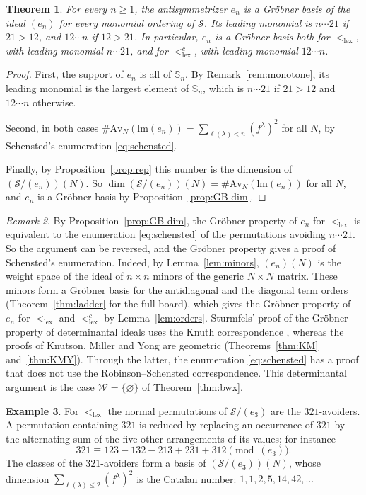 \documentclass[11pt]{amsart}
\newtheorem{theorem}{Theorem}[section]
\theoremstyle{definition}
\newtheorem{example}[theorem]{Example}
\theoremstyle{remark}
\newtheorem{remark}[theorem]{Remark}
\newcommand{\bS}{\mathbb{S}}
\newcommand{\lm}{\mathrm{lm}}
\newcommand{\cS}{\mathscr{S}}
\newcommand{\cW}{\mathcal{W}}
\newcommand{\Av}{\mathrm{Av}}
\newcommand{\lex}{\mathrm{lex}}
\begin{document}
\begin{theorem}\label{thm:en}
For every $n\ge1$, the antisymmetrizer $e_n$ is a Gr\"obner basis of the ideal $(e_n)$ for every monomial ordering of $\cS$. Its leading monomial is $n\cdots21$ if $21>12$, and $12\cdots n$ if $12>21$. In particular, $e_n$ is a Gr\"obner basis both for $<_\lex$, with leading monomial $n\cdots21$, and for $<_\lex^c$, with leading monomial $12\cdots n$.
\end{theorem}

\begin{proof}
First, the support of $e_n$ is all of $\bS_n$. By Remark~\ref{rem:monotone}, its leading monomial is the largest element of $\bS_n$, which is $n\cdots21$ if $21>12$ and $12\cdots n$ otherwise.

Second, in both cases $\#\Av_N(\lm(e_n))=\sum_{\ell(\lambda)<n}(f^\lambda)^2$ for all $N$, by Schensted's enumeration \eqref{eq:schensted}.

Finally, by Proposition~\ref{prop:rep} this number is the dimension of $(\cS/(e_n))(N)$. So $\dim(\cS/(e_n))(N)=\#\Av_N(\lm(e_n))$ for all $N$, and $e_n$ is a Gr\"obner basis by Proposition~\ref{prop:GB-dim}.
\end{proof}

\begin{remark}\label{rem:rsk}
By Proposition~\ref{prop:GB-dim}, the Gr\"obner property of $e_n$ for $<_\lex$ is equivalent to the enumeration \eqref{eq:schensted} of the permutations avoiding $n\cdots21$. So the argument can be reversed, and the Gr\"obner property gives a proof of Schensted's enumeration. Indeed, by Lemma~\ref{lem:minors}, $(e_n)(N)$ is the weight space of the ideal of $n\times n$ minors of the generic $N\times N$ matrix. These minors form a Gr\"obner basis for the antidiagonal and the diagonal term orders (Theorem~\ref{thm:ladder} for the full board), which gives the Gr\"obner property of $e_n$ for $<_\lex$ and $<_\lex^c$ by Lemma~\ref{lem:orders}. Sturmfels' proof of the Gr\"obner property of determinantal ideals \cite{Sturmfels} uses the Knuth correspondence \cite{Knuth}, whereas the proofs of Knutson, Miller and Yong \cite{KM,KMY} are geometric (Theorems~\ref{thm:KM} and~\ref{thm:KMY}). Through the latter, the enumeration \eqref{eq:schensted} has a proof that does not use the Robinson--Schensted correspondence. This determinantal argument is the case $\cW=\{\varnothing\}$ of Theorem~\ref{thm:bwx}.
\end{remark}

\begin{example}\label{ex:normal}
For $<_\lex$ the normal permutations of $\cS/(e_3)$ are the $321$-avoiders. A permutation containing $321$ is reduced by replacing an occurrence of $321$ by the alternating sum of the five other arrangements of its values; for instance
\[
321\equiv123-132-213+231+312\pmod{(e_3)} .
\]
The classes of the $321$-avoiders form a basis of $(\cS/(e_3))(N)$, whose dimension $\sum_{\ell(\lambda)\le2}(f^\lambda)^2$ is the Catalan number: $1,1,2,5,14,42,\dots$
\end{example}
\end{document}
